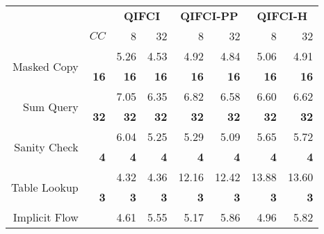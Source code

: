 \begin{center}
\begin{table}[]
\begin{tabular}{rr|rrrrrr}
                                      &              & \multicolumn{2}{c}{\textbf{QIFCI}}              & \multicolumn{2}{c}{\textbf{QIFCI-PP}}            & \multicolumn{2}{c}{\textbf{QIFCI-H}} \\
                                      & $CC$         & 8            & \multicolumn{1}{r|}{32}           & 8            & \multicolumn{1}{r|}{32}           & 8                 & 32               \\ \hline
\multirow{2}{*}{Masked Copy}          &              & 5.26         & \multicolumn{1}{r|}{4.53}         & 4.92         & \multicolumn{1}{r|}{4.84}         & 5.06              & 4.91             \\
                                      & \textbf{16}  & \textbf{16}  & \multicolumn{1}{r|}{\textbf{16}}  & \textbf{16}  & \multicolumn{1}{r|}{\textbf{16}}  & \textbf{16}       & \textbf{16}      \\ \hline
\multirow{2}{*}{Sum Query}            &              & 7.05         & \multicolumn{1}{r|}{6.35}         & 6.82         & \multicolumn{1}{r|}{6.58}         & 6.60              & 6.62             \\
                                      & \textbf{32}  & \textbf{32}  & \multicolumn{1}{r|}{\textbf{32}}  & \textbf{32}  & \multicolumn{1}{r|}{\textbf{32}}  & \textbf{32}       & \textbf{32}      \\ \hline
\multirow{2}{*}{Sanity Check}         &              & 6.04         & \multicolumn{1}{r|}{5.25}         & 5.29         & \multicolumn{1}{r|}{5.09}         & 5.65              & 5.72             \\
                                      & \textbf{4}   & \textbf{4}   & \multicolumn{1}{r|}{\textbf{4}}   & \textbf{4}   & \multicolumn{1}{r|}{\textbf{4}}   & \textbf{4}        & \textbf{4}       \\ \hline
\multirow{2}{*}{Table Lookup}         &              & 4.32         & \multicolumn{1}{r|}{4.36}         & 12.16        & \multicolumn{1}{r|}{12.42}        & 13.88             & 13.60            \\
                                      & \textbf{3}   & \textbf{3}   & \multicolumn{1}{r|}{\textbf{3}}   & \textbf{3}   & \multicolumn{1}{r|}{\textbf{3}}   & \textbf{3}        & \textbf{3}       \\ \hline
\multirow{2}{*}{Implicit Flow}        &              & 4.61         & \multicolumn{1}{r|}{5.55}         & 5.17         & \multicolumn{1}{r|}{5.86}         & 4.96              & 5.82             \\

\end{tabular}
\end{table}
\end{center}

